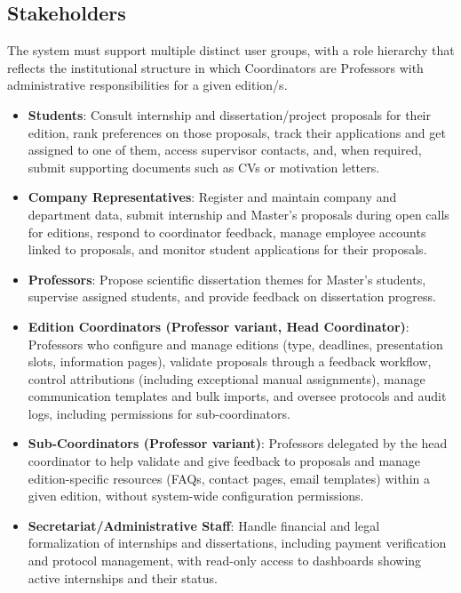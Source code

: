     \subsection{Stakeholders}
        {
            The system must support multiple distinct user groups, with a role hierarchy that reflects the institutional structure in which Coordinators
            are Professors with administrative responsibilities for a given edition/s.
        }
        \begin{itemize}
            \item{
                \textbf{Students}: Consult internship and dissertation/project proposals for their edition, rank preferences on those proposals, track their applications
                and get assigned to one of them, access supervisor contacts, and, when required, submit supporting documents such as CVs or motivation letters.
            }
            \item{
                \textbf{Company Representatives}: Register and maintain company and department data, submit internship and Master's proposals during open calls for editions, respond 
                to coordinator feedback, manage employee accounts linked to proposals, and monitor student applications for their proposals.
            }
            \item{
                \textbf{Professors}: Propose scientific dissertation themes for Master's students, supervise assigned students, and provide feedback on dissertation progress. 
            }
            \item{
                \textbf{Edition Coordinators (Professor variant, Head Coordinator)}: Professors who configure and manage editions (type, deadlines, presentation slots, information pages),
                validate proposals through a feedback workflow, control attributions (including exceptional manual assignments), manage communication templates and bulk imports,
                and oversee protocols and audit logs, including permissions for sub-coordinators.
            }
            \item{
                \textbf{Sub-Coordinators (Professor variant)}: Professors delegated by the head coordinator to help validate and give feedback to proposals and manage edition-specific resources
                (FAQs, contact pages, email templates) within a given edition, without system-wide configuration permissions. 
            }
            \item{
                \textbf{Secretariat/Administrative Staff}: Handle financial and legal formalization of internships and dissertations, including payment verification and protocol management, with
                read-only access to dashboards showing active internships and their status. 
            }
        \end{itemize}

